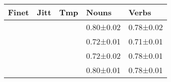 \begin{tabular}{lllll}
	\toprule
	Finet &       Jitt &        Tmp &     Nouns &     Verbs \\
	\midrule
	\checkmark & \checkmark & \checkmark & 0.80±0.02 & 0.78±0.02 \\
	& \checkmark & \checkmark & 0.72±0.01 & 0.71±0.01 \\
	\checkmark &            & \checkmark & 0.72±0.02 & 0.78±0.01 \\
	\checkmark & \checkmark &            & 0.80±0.01 & 0.78±0.01 \\
	\bottomrule
\end{tabular}
